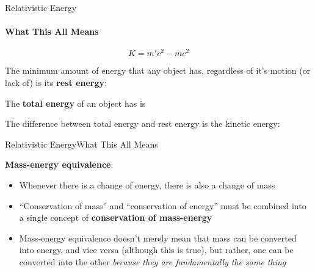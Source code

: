 \documentclass[12pt,compress,aspectratio=169]{beamer}
\newcommand{\eq}[2]{\vspace{#1}{\Large\begin{displaymath}#2\end{displaymath}}}
\begin{document}
\begin{frame}{Relativistic Energy}
  \framesubtitle{What This All Means}
  {\Large
    \begin{displaymath}
      \boxed{K=m'c^2-mc^2}
    \end{displaymath}
  }

  The minimum amount of energy that any object has, regardless of it's motion
  (or lack of) is its \textbf{rest energy}:
  
  \eq{-.4in}{ E_0=mc^2 }

  \vspace{-.2in}The \textbf{total energy} of an object has is
    
  \eq{-.3in}{
    E_T=m'c^2=\gamma mc^2
  }

  \vspace{-.2in}The difference between total energy and rest energy is the
  kinetic energy:

  \eq{-.3in}{
    K=E_T-E_0
  }
\end{frame}


\begin{frame}{Relativistic Energy}{What This All Means}
  
  \eq{-.2in}{
    \boxed{E=mc^2}
  }

  \textbf{Mass-energy equivalence}:
  \begin{itemize}
  \item Whenever there is a change of energy, there is also a change of mass
  \item ``Conservation of mass'' and ``conservation of energy'' must be
    combined into a single concept of \textbf{conservation of mass-energy}
  \item Mass-energy equivalence doesn't merely mean that mass can be converted
    into energy, and vice versa (although this is true), but rather, one can be
    converted into the other
    \emph{because they are fundamentally the same thing}
  \end{itemize}
\end{frame}



\end{document}
